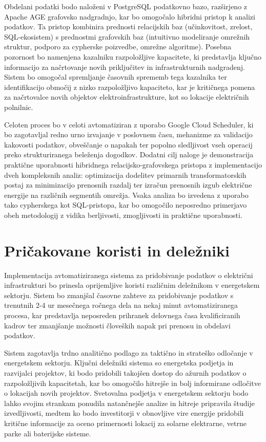 \documentclass[a4paper,12pt,openright]{book}
\begin{document}
Obdelani podatki bodo naloženi v PostgreSQL podatkovno bazo, razširjeno z Apache AGE grafovsko nadgradnjo, kar bo omogočalo hibridni pristop k analizi podatkov. Ta pristop kombinira prednosti relacijskih baz (učinkovitost, zrelost, SQL-ekosistem) s prednostmi grafovskih baz (intuitivno modeliranje omrežnih struktur, podporo za cypherske poizvedbe, omrežne algoritme). Posebna pozornost bo namenjena kazalniku razpoložljive kapacitete, ki predstavlja ključno informacijo za načrtovanje novih priključitev in infrastrukturnih nadgradenj. Sistem bo omogočal spremljanje časovnih sprememb tega kazalnika ter identifikacijo območij z nizko razpoložljivo kapaciteto, kar je kritičnega pomena za načrtovalce novih objektov elektroinfrastrukture, kot so lokacije električnih polnilnic.

Celoten proces bo v celoti avtomatiziran z uporabo Google Cloud Scheduler, ki bo zagotavljal redno urno izvajanje v poslovnem času, mehanizme za validacijo kakovosti podatkov, obveščanje o napakah ter popolno sledljivost vseh operacij preko strukturiranega beleženja dogodkov. Dodatni cilj naloge je demonstracija praktične uporabnosti hibridnega relacijsko-grafovskega pristopa z implementacijo dveh kompleksnih analiz: optimizacija dodelitev primarnih transformatorskih postaj za minimizacijo prenosnih razdalj ter izračun prenosnih izgub električne energije na različnih segmentih omrežja. Vsaka analiza bo izvedena z uporabo tako cypherskega kot SQL-pristopa, kar bo omogočilo neposredno primerjavo obeh metodologij z vidika berljivosti, zmogljivosti in praktične uporabnosti.

\section{Pričakovane koristi in deležniki}

Implementacija avtomatiziranega sistema za pridobivanje podatkov o električni infrastrukturi bo prinesla oprijemljive koristi različnim deležnikom v energetskem sektorju. Sistem bo zmanjšal časovne zahteve za pridobivanje podatkov s trenutnih 2-4 ur mesečnega ročnega dela na nekaj minut avtomatiziranega procesa, kar predstavlja neposreden prihranek delovnega časa kvalificiranih kadrov ter zmanjšanje možnosti človeških napak pri prenosu in obdelavi podatkov.

Sistem zagotavlja trdno analitično podlago za taktično in strateško odločanje v energetskem sektorju. Ključni deležniki sistema so energetska podjetja in razvijalci projektov, ki bodo pridobili takojšen dostop do ažurnih podatkov o razpoložljivih kapacitetah, kar bo omogočilo hitrejše in bolj informirane odločitve o lokacijah novih projektov. Svetovalna podjetja v energetskem sektorju bodo lahko svojim strankam ponudila natančnejše analize in hitreje pripravila študije izvedljivosti, medtem ko bodo investitorji v obnovljive vire energije pridobili kritične informacije za oceno primernosti lokacij za solarne elektrarne, vetrne parke ali baterijske sisteme.
\end{document}
